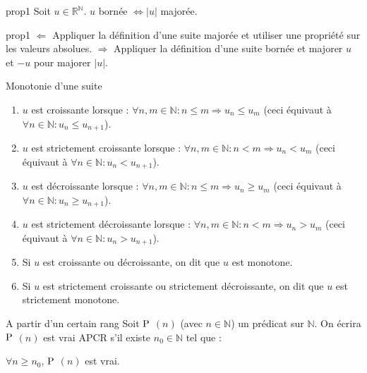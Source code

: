\documentclass[12pt,a4paper]{report}
\begin{document}
\begin{proposition}{}{prop1}
Soit $u \in \mathbb{R}^\mathbb{N}$. $u$ bornée $\Longleftrightarrow \lvert u \rvert$ majorée.
\end{proposition}

\begin{principedemo}{prop1}
$\Longleftarrow$ Appliquer la définition d'une suite majorée et utiliser une propriété sur les valeurs absolues.
\newline $\Longrightarrow$ Appliquer la définition d'une suite bornée et majorer $u$ et $-u$ pour majorer $\lvert u \rvert$.
\end{principedemo}


\begin{definition}{Monotonie d'une suite}{}
\begin{enumerate}
\item $u$ est croissante lorsque : $\forall n,m \in \mathbb{N} : n \leq m \Longrightarrow u_n \leq u_m$ \newline (ceci équivaut à $\forall n \in \mathbb{N} : u_n \leq u_{n+1}$).
\item $u$ est strictement croissante lorsque : $\forall n,m \in \mathbb{N} : n < m \Longrightarrow u_n < u_m$ \newline (ceci équivaut à $\forall n \in \mathbb{N} : u_n < u_{n+1}$).
\item $u$ est décroissante lorsque : $\forall n,m \in \mathbb{N} : n \leq m \Longrightarrow u_n \geq u_m$ \newline (ceci équivaut à $\forall n \in \mathbb{N} : u_n \geq u_{n+1}$).
\item $u$ est strictement décroissante lorsque : $\forall n,m \in \mathbb{N} : n < m \Longrightarrow u_n > u_m$ \newline (ceci équivaut à $\forall n \in \mathbb{N} : u_n > u_{n+1}$).
\item Si $u$ est croissante ou décroissante, on dit que $u$ est monotone.
\item Si $u$ est strictement croissante ou strictement décroissante, on dit que $u$ est strictement monotone.
\end{enumerate}
\end{definition}

\begin{definition}{A partir d'un certain rang}{}
Soit $\rm{P}$ $(n)$ (avec $n \in \mathbb{N}$) un prédicat sur $\mathbb{N}$. On écrira $\rm{P}$ $(n)$ est vrai APCR s'il existe $n_0 \in \mathbb{N}$ tel que :
\begin{center}
$\forall n \geq n_0$, $ \rm{P}$ $(n)$ est vrai.    
\end{center} 
\end{definition}
\end{document}
